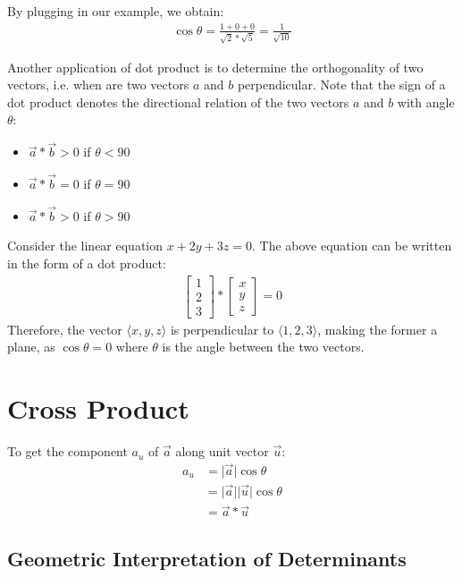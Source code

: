 \documentclass[12pt]{article}
\newcommand{\mov}[1]{\lvert \vec{#1} \rvert}
\newcommand{\iv}[1]{\langle #1 \rangle}
\theoremstyle{definition}
\begin{document}
	By plugging in our example, we obtain:
	\begin{gather*}
		\cos \theta = \frac{1 + 0 + 0}{\sqrt{2} * \sqrt{5}} = \frac{1}{\sqrt{10}}
	\end{gather*}
	
	Another application of dot product is to determine the orthogonality of two vectors, i.e. when are two vectors $a$ and $b$ perpendicular. Note that the sign of a dot product denotes the directional relation of the two vectors $a$ and $b$ with angle $\theta$:
	\begin{itemize}
		\item $\vec{a} * \vec{b} > 0$ if $\theta < 90$
		\item $\vec{a} * \vec{b} = 0$ if $\theta = 90$
		\item $\vec{a} * \vec{b} > 0$ if $\theta > 90$
	\end{itemize}
	
	Consider the linear equation $x + 2y + 3z = 0$. The above equation can be written in the form of a dot product:
	\begin{gather*}
		\begin{bmatrix}
			1 \\ 2 \\ 3
		\end{bmatrix} *
		\begin{bmatrix}
			x \\ y \\ z
		\end{bmatrix} = 0
	\end{gather*}
	Therefore, the vector $\iv{x, y, z}$ is perpendicular to $\iv{1, 2, 3}$, making the former a plane, as $\cos \theta = 0$ where $\theta$ is the angle between the two vectors.
	
	\section{Cross Product}
	
	To get the component $a_u$ of $\vec{a}$ along unit vector $\vec{u}$:
	\begin{align*}
		a_u &= \mov{a}\cos{\theta} \\
		&= \mov{a}\mov{u}\cos{\theta} \\
		&= \vec{a} * \vec{u}
	\end{align*}
	
	\subsection{Geometric Interpretation of Determinants}
	
\end{document}
